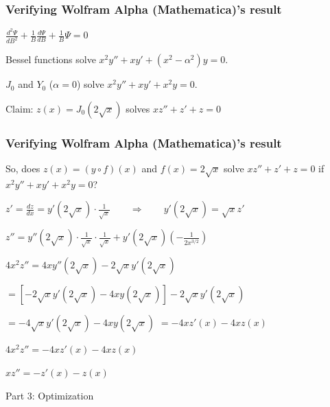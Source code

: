 \documentclass{beamer}
\begin{document}
\begin{frame}
\frametitle{Verifying Wolfram Alpha (Mathematica)'s result}
\begin{center}
\centerline{$\frac{d^2\Psi}{dB^2} + \frac{1}{B}\frac{d\Psi}{dB} + \frac{1}{B}\Psi = 0$}
\vskip 40pt

Bessel functions solve $x^2 y'' + x y' + (x^2 - \alpha^2)y = 0$.
\vskip 20pt

$J_0$ and $Y_0$ ($\alpha = 0$) solve $x^2 y'' + x y' + x^2 y = 0$.

\vskip 20pt
Claim: $z(x) = J_0(2\sqrt{x})$ solves $x z'' + z' + z = 0$
\end{center}
\end{frame}

\begin{frame}
\frametitle{Verifying Wolfram Alpha (Mathematica)'s result}
\begin{center}
So, does $z(x) = (y\circ f)(x)$ and $f(x) = 2\sqrt{x}$ solve $x z'' + z' + z = 0$
if $x^2 y'' + x y' + x^2 y = 0$?

\vskip 20pt 

$z' = \frac{dz}{dx} = y'(2\sqrt{x}) \cdot \frac{1}{\sqrt{x}} \qquad \Rightarrow \qquad y'(2\sqrt{x}) = \sqrt{x} z'$

$z'' = y''(2\sqrt{x}) \cdot \frac{1}{\sqrt{x}} \cdot \frac{1}{\sqrt{x}} + y'(2\sqrt{x}) \left(-\frac{1}{2x^{3/2}}\right)$

\vskip 20pt 

$4 x^2 z'' = 4 x y''(2\sqrt{x}) - 2 \sqrt{x} y'(2\sqrt{x})$

$ = \left[ -2 \sqrt{x} y'(2\sqrt{x}) - 4x y(2\sqrt{x})\right] - 2 \sqrt{x} y'(2\sqrt{x})$

$ = -4 \sqrt{x} y'(2\sqrt{x}) - 4x y(2\sqrt{x})$
$ = -4 x z'(x) - 4x z(x)$

\vskip 20pt
$4 x^2 z'' = -4 x z'(x) - 4x z(x)$

$x z'' = - z'(x) - z(x)$
\end{center}
\end{frame}

\begin{frame}
\begin{exampleblock}{}
\begin{center}
\vskip 20pt
\Huge
Part 3: Optimization
\vskip 6pt
\ 
\end{center}
\end{exampleblock}
\end{frame}
\end{document}
